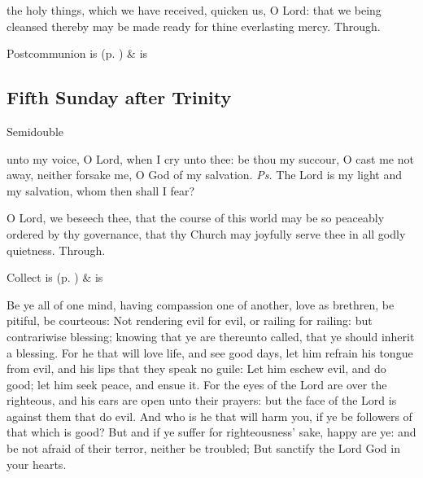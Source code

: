 
\postcommunion
{} the holy things, which we have received, quicken us, O Lord: that we being cleansed thereby may be made ready for thine everlasting mercy. Through.
\begin{rubric}
     Postcommunion is  (p. \pageref{SPSaints}) \&  is 
\end{rubric}


\clearpage
\subsection{Fifth Sunday after Trinity}
\begin{inhead}
    {Semidouble}
\end{inhead}


\introit
{} unto my voice, O Lord, when I cry unto thee: be thou my succour, O cast me not away, neither forsake me, O God of my salvation. \textit{Ps.} The Lord is my light and my salvation, whom then shall I fear?

\collect
{} O Lord, we beseech thee, that the course of this world may be so peaceably ordered by thy governance, that thy Church may joyfully serve thee in all godly quietness. Through.
\begin{rubric}
     Collect is  (p. \pageref{SPSaints}) \&  is 
\end{rubric}

 Be ye all of one mind, having compassion one of another, love as brethren, be pitiful, be courteous: Not rendering evil for evil, or railing for railing: but contrariwise blessing; knowing that ye are thereunto called, that ye should inherit a blessing. For he that will love life, and see good days, let him refrain his tongue from evil, and his lips that they speak no guile: Let him eschew evil, and do good; let him seek peace, and ensue it. For the eyes of the Lord are over the righteous, and his ears are open unto their prayers: but the face of the Lord is against them that do evil. And who is he that will harm you, if ye be followers of that which is good? But and if ye suffer for righteousness' sake, happy are ye: and be not afraid of their terror, neither be troubled; But sanctify the Lord God in your hearts.

